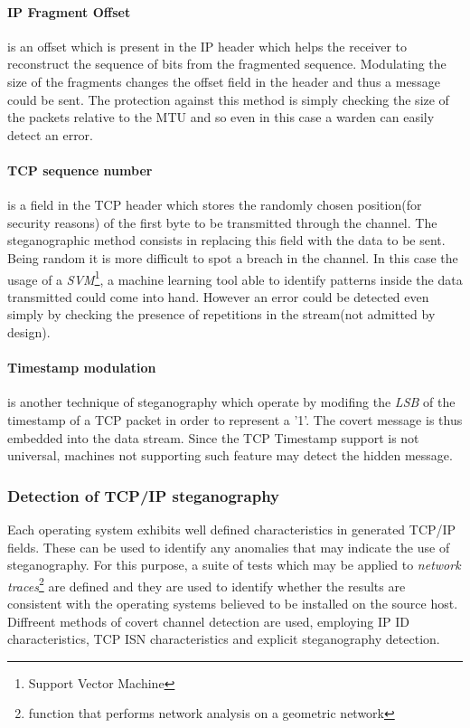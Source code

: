 \documentclass[../../main.tex]{subfiles}
\begin{document}
    \paragraph{IP Fragment Offset} is an offset which is present in the IP header
    which helps the receiver to reconstruct the sequence of bits from the
    fragmented sequence.
    Modulating the size of the fragments changes the offset field in the header
    and thus a message could be sent.
    The protection against this method is simply checking the size of the
    packets relative to the MTU and so even in this case a warden can easily
    detect an error.

    \paragraph{TCP sequence number} is a field in the TCP header which stores the
    randomly chosen position(for security reasons) of the first byte to be
    transmitted through the channel. The steganographic method consists in
    replacing this field with the data to be sent.
    Being random it is more difficult to spot a breach in the channel.
    In this case the usage of a \emph{SVM}\footnote{Support Vector Machine}, a
    machine learning tool able to identify patterns inside the data transmitted
    could come into hand.
    However an error could be detected even simply by checking the presence of
    repetitions in the stream(not admitted by design). 

    \paragraph{Timestamp modulation} is another technique of steganography which
    operate by modifing the \emph{LSB} of the
    timestamp of a TCP packet in order to represent a '1'.
    The covert message is thus embedded into the data stream.
    Since the TCP Timestamp support is not universal, machines not supporting
    such feature may detect the hidden message.


    \subsubsection{Detection of TCP/IP steganography}

    Each operating system exhibits well defined characteristics in generated
    TCP/IP fields. These can be used to identify any anomalies that may indicate 
    the use of steganography. For this purpose, a suite of tests which may be
    applied to \emph{network traces}\footnote{function that performs network analysis
    on a geometric network} are defined and they are used to identify whether 
    the results are consistent with the operating systems believed to be installed
    on the source host.
    Diffreent methods of covert channel detection are used, employing IP ID 
    characteristics, TCP ISN characteristics and explicit steganography detection.
\end{document}
